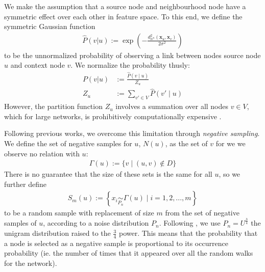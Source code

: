 \documentclass{article}
\begin{document}
We make the assumption that a source node and neighbourhood node have a symmetric effect over each other in feature space.
To this end, we define the symmetric Gaussian function 
\begin{align*}
\hat{P}(v|u) := \exp\left(-\frac{d^2_{\mathbb{H}^n}(\textbf{x}_u, \textbf{x}_v)}{2\sigma^2}\right)
\end{align*}
to be the unnormalized probability of observing a link between nodes source node $u$ and context node $v$. 
We normalize the probability thusly:
\begin{align*}
P(v|u) &:= \frac{\hat{P}(v\mid u)}{Z_u} \\
Z_u &:= \sum_{v'\in V} \hat{P}(v'\mid u)
\end{align*}
However, the partition function $Z_u$ involves a summation over all nodes $v\in V$, which for large networks, is prohibitively computationally expensive \cite{grover2016node2vec}.

Following previous works, we overcome this limitation through \textit{negative sampling}.
We define the set of negative samples for $u$, $N(u)$, as the set of $v$ for we we observe no relation with $u$:
\begin{align*}
\Gamma(u) := \{v \mid (u,v) \not\in D \}
\end{align*}
There is no guarantee that the size of these sets is the same for all $u$, so we further define
\begin{align*}
S_m(u) := \left\{ x_i \underset{P_n}{\sim} \Gamma(u) \mid i = 1,2,...,m  \right\}
\end{align*}
to be a random sample with replacement of size $m$ from the set of negative samples of $u$, according to a noise distribution $P_n$.
Following \cite{grover2016node2vec}, we use $P_n = U ^ \frac{3}{4}$ the unigram distribution raised to the $\frac{3}{4}$ power.
This means that the probability that a node is selected as a negative sample is proportional to its occurrence probability (ie. the number of times that it appeared over all the random walks for the network).
\end{document}
